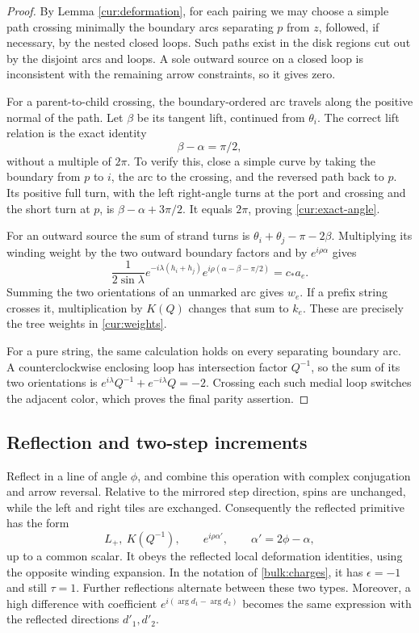 \begin{proof}
By Lemma \ref{cur:deformation}, for each pairing we may choose a
simple path crossing minimally the boundary arcs separating $p$
from $z$, followed, if necessary, by the nested closed loops.
Such paths exist in the disk regions cut out by the disjoint
arcs and loops. A sole outward source on a closed loop is
inconsistent with the remaining arrow constraints, so it gives
zero.

For a parent-to-child crossing, the boundary-ordered arc travels
along the positive normal of the path. Let $\beta$ be its
tangent lift, continued from $\theta_i$. The correct lift relation
is the exact identity
\begin{equation}\label{cur:exact-angle}
 \beta-\alpha=\pi/2,
\end{equation}
without a multiple of $2\pi$. To verify this, close a simple curve
by taking the boundary from $p$ to $i$, the arc to the crossing,
and the reversed path back to $p$. Its positive full turn, with
the left right-angle turns at the port and crossing and the
short turn at $p$, is $\beta-\alpha+3\pi/2$. It equals $2\pi$,
proving \eqref{cur:exact-angle}.

For an outward source the sum of strand turns is
$\theta_i+\theta_j-\pi-2\beta$. Multiplying its winding weight by
the two outward boundary factors and by $e^{i\rho\alpha}$ gives
\[
 \frac1{2\sin\lambda}
 e^{-i\lambda(h_i+h_j)}
 e^{i\rho(\alpha-\beta-\pi/2)}
 =c_*a_e.
\]
Summing the two orientations of an unmarked arc gives $w_e$.
If a prefix string crosses it, multiplication by $K(Q)$ changes
that sum to $k_e$. These are precisely the tree weights in
\eqref{cur:weights}.

For a pure string, the same calculation holds on every separating
boundary arc. A counterclockwise enclosing loop has intersection
factor $Q^{-1}$, so the sum of its two orientations is
$e^{i\lambda}Q^{-1}+e^{-i\lambda}Q=-2$.
Crossing each such medial loop switches the adjacent color,
which proves the final parity assertion.
\end{proof}

\subsection{Reflection and two-step increments}

Reflect in a line of angle $\phi$, and combine this operation
with complex conjugation and arrow reversal. Relative to the
mirrored step direction, spins are unchanged, while the left and
right tiles are exchanged. Consequently the reflected primitive
has the form
\[
 L_+,\ K(Q^{-1}),\qquad e^{i\rho\alpha'},
 \qquad \alpha'=2\phi-\alpha,
\]
up to a common scalar. It obeys the reflected local deformation
identities, using the opposite winding expansion. In the notation
of \eqref{bulk:charges}, it has $\epsilon=-1$ and still $\tau=1$.
Further reflections alternate between these two types. Moreover,
a high difference with coefficient
$e^{i(\arg d_1-\arg d_2)}$ becomes the same expression with the
reflected directions $d'_1,d'_2$.

